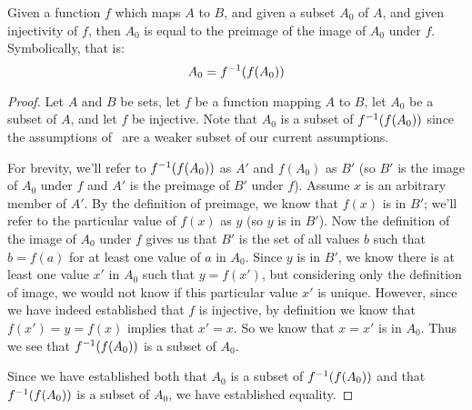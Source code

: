 \documentclass[main.tex]{subfiles}
\begin{document}
\begin{thm}
	Given a function \(f\) which maps \(A\) to \(B\), and given a subset
	\(A_0\) of \(A\), and given injectivity of \(f\), then \(A_0\) is equal
	to the preimage of the image of \(A_0\) under \(f\). Symbolically, that
	is:
	\[A_0 = {f}^{-1}(f(A_0))\]
\end{thm}
\begin{proof}
	Let \(A\) and \(B\) be sets, let \(f\) be a function mapping \(A\) to
	\(B\), let \(A_0\) be a subset of \(A\), and let \(f\) be injective.
	Note that \(A_0\) is a subset of \({f}^{-1}(f(A_0))\) since the
	assumptions of~ are a weaker subset of our current
	assumptions.

	For brevity, we'll refer to \({f}^{-1}(f(A_0))\) as \(A'\) and
	\(f(A_0)\) as \(B'\) (so \(B'\) is the image of \(A_0\) under \(f\) and
	\(A'\) is the preimage of \(B'\) under \(f\)). Assume \(x\) is an
	arbitrary member of \(A'\). By the definition of preimage, we know that
	\(f(x)\) is in \(B'\); we'll refer to the particular value of \(f(x)\)
	as \(y\) (so \(y\) is in \(B'\)). Now the definition of the image of
	\(A_0\) under \(f\) gives us that \(B'\) is the set of all values \(b\)
	such that \(b = f(a)\) for at least one value of \(a\) in \(A_0\). Since
	\(y\) is in \(B'\), we know there is at least one value \(x'\) in
	\(A_0\) such that \(y = f(x')\), but considering only the definition of
	image, we would not know if this particular value \(x'\) is unique.
	However, since we have indeed established that \(f\) is injective, by
	definition we know that \(f(x') = y = f(x)\) implies that \(x' = x\). So
	we know that \(x = x'\) is in \(A_0\). Thus we see that
	\({f}^{-1}(f(A_0))\) is a subset of \(A_0\).

	Since we have established both that \(A_0\) is a subset of
	\({f}^{-1}(f(A_0))\) and that \({f}^{-1}(f(A_0))\) is a subset of
	\(A_0\), we have established equality.
\end{proof}
\end{document}
